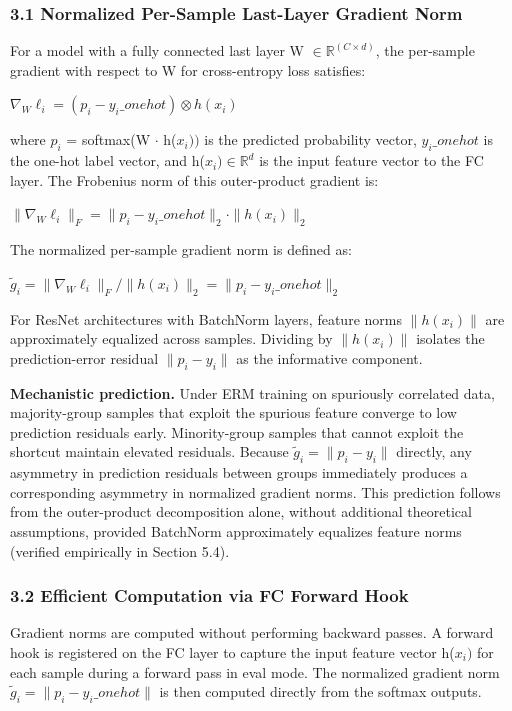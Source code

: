 
\subsubsection{3.1 Normalized Per-Sample Last-Layer Gradient Norm}

For a model with a fully connected last layer W $\in \mathbb{R}^(C\times d)$, the per-sample gradient with respect to W for cross-entropy loss satisfies:

$\nabla _W \ell _i = (p_i - y_{i}\_onehot) \otimes h(x_{i})$

where $p_i$ = softmax(W $\cdot$ h($x_{i}))$ is the predicted probability vector, $y_{i}\_onehot$ is the one-hot label vector, and h($x_{i}) \in \mathbb{R}^d$ is the input feature vector to the FC layer. The Frobenius norm of this outer-product gradient is:

$\|\nabla _W \ell _{i}\|_F = \|p_i - y_{i}\_onehot\|_2 \cdot \|h(x_{i})\|_2$

The normalized per-sample gradient norm is defined as:

\textbf{$\tilde{g}_i = \|\nabla _W \ell _{i}\|_F / \|h(x_{i})\|_2 = \|p_i - y_{i}\_onehot\|_2$}

For ResNet architectures with BatchNorm layers, feature norms $\|h(x_{i})\|$ are approximately equalized across samples. Dividing by $\|h(x_{i})\|$ isolates the prediction-error residual $\|p_i - y_{i}\|$ as the informative component.

\textbf{Mechanistic prediction.} Under ERM training on spuriously correlated data, majority-group samples that exploit the spurious feature converge to low prediction residuals early. Minority-group samples that cannot exploit the shortcut maintain elevated residuals. Because $\tilde{g}_i = \|p_i - y_{i}\|$ directly, any asymmetry in prediction residuals between groups immediately produces a corresponding asymmetry in normalized gradient norms. This prediction follows from the outer-product decomposition alone, without additional theoretical assumptions, provided BatchNorm approximately equalizes feature norms (verified empirically in Section 5.4).

\subsubsection{3.2 Efficient Computation via FC Forward Hook}

Gradient norms are computed without performing backward passes. A forward hook is registered on the FC layer to capture the input feature vector h($x_{i})$ for each sample during a forward pass in eval mode. The normalized gradient norm $\tilde{g}_i = \|p_i - y_{i}\_onehot\|$ is then computed directly from the softmax outputs.

